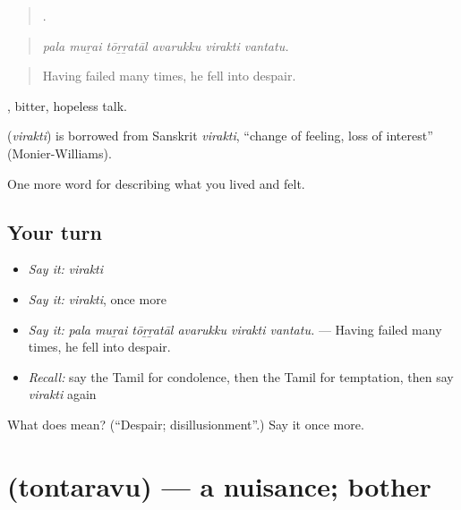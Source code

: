 \begin{quote}
     .
\end{quote}

\begin{quote}
\emph{pala muṟai tōṟṟatāl avarukku virakti vantatu.}
\end{quote}

\begin{quote}
Having failed many times, he fell into despair.
\end{quote}

 , bitter, hopeless talk.

\begin{cousinweb}
\textbf{} (\emph{virakti}) is borrowed from Sanskrit \emph{virakti}, \textquotedblleft{}change of feeling, loss of interest\textquotedblright{} (Monier-Williams).
\end{cousinweb}

\begin{grammarlens}[title={What you've built}]
One more word for describing what you lived and felt.
\end{grammarlens}

\subsection*{Your turn}
\begin{itemize}
\raggedright
  \item \emph{Say it:} \emph{virakti}
  \item \emph{Say it:} \emph{virakti}, once more
  \item \emph{Say it:} \emph{pala muṟai tōṟṟatāl avarukku virakti vantatu.} — Having failed many times, he fell into despair.
  \item \emph{Recall:} say the Tamil for condolence, then the Tamil for temptation, then say \emph{virakti} again
\end{itemize}

\begin{tcolorbox}[breakable,colback=teal!4,colframe=teal!35!black,title={Before you move on}]
What does  mean? (\textquotedblleft{}Despair; disillusionment\textquotedblright{}.) Say it once more.
\end{tcolorbox}
\section[\texorpdfstring{\ta{தொந்தரவு} (tontaravu)}{தொந்தரவு (tontaravu)}]{ (tontaravu) — a nuisance; bother}

